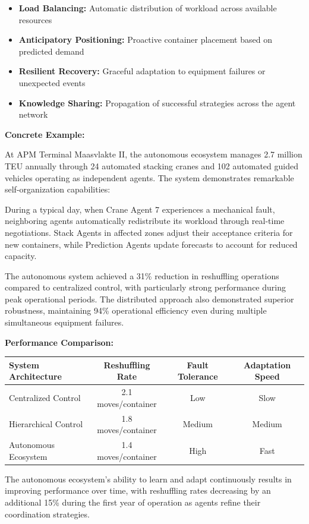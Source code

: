 \documentclass{article}
\begin{document}
\begin{itemize}
\item \textbf{Load Balancing:} Automatic distribution of workload across available resources
\item \textbf{Anticipatory Positioning:} Proactive container placement based on predicted demand
\item \textbf{Resilient Recovery:} Graceful adaptation to equipment failures or unexpected events
\item \textbf{Knowledge Sharing:} Propagation of successful strategies across the agent network
\end{itemize}

\textbf{Concrete Example:}

At APM Terminal Maasvlakte II, the autonomous ecosystem manages 2.7 million TEU annually through 24 automated stacking cranes and 102 automated guided vehicles operating as independent agents. The system demonstrates remarkable self-organization capabilities:

During a typical day, when Crane Agent 7 experiences a mechanical fault, neighboring agents automatically redistribute its workload through real-time negotiations. Stack Agents in affected zones adjust their acceptance criteria for new containers, while Prediction Agents update forecasts to account for reduced capacity.

The autonomous system achieved a 31\% reduction in reshuffling operations compared to centralized control, with particularly strong performance during peak operational periods. The distributed approach also demonstrated superior robustness, maintaining 94\% operational efficiency even during multiple simultaneous equipment failures.

\textbf{Performance Comparison:}

\begin{center}
\begin{tabular}{lccc}
\toprule
System Architecture & Reshuffling Rate & Fault Tolerance & Adaptation Speed \\
\midrule
Centralized Control & 2.1 moves/container & Low & Slow \\
Hierarchical Control & 1.8 moves/container & Medium & Medium \\
Autonomous Ecosystem & 1.4 moves/container & High & Fast \\
\bottomrule
\end{tabular}
\end{center}

The autonomous ecosystem's ability to learn and adapt continuously results in improving performance over time, with reshuffling rates decreasing by an additional 15\% during the first year of operation as agents refine their coordination strategies.
\end{document}
